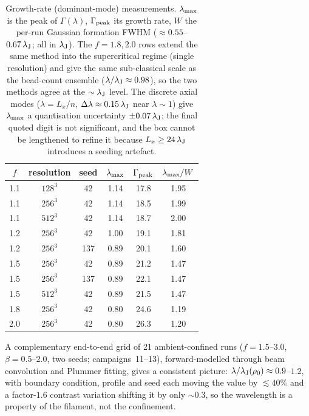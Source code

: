 \documentclass[usenatbib,twoside,twocolumn]{mnras}
\begin{document}
\begin{table}
\caption{Growth-rate (dominant-mode) measurements. $\lambda_{\rm max}$ is the peak of $\Gamma(\lambda)$, $\Gamma_{\rm peak}$ its growth rate, $W$ the per-run Gaussian formation FWHM ($\approx0.55$--$0.67\,\lambda_{\rm J}$; all in $\lambda_{\rm J}$). The $f=1.8,2.0$ rows extend the same method into the supercritical regime (single resolution) and give the same sub-classical scale as the bead-count ensemble ($\lambda/\lambda_{\rm J}\approx0.98$), so the two methods agree at the $\sim\lambda_{\rm J}$ level. The discrete axial modes ($\lambda=L_x/n$, $\Delta\lambda\approx0.15\,\lambda_{\rm J}$ near $\lambda\sim1$) give $\lambda_{\rm max}$ a quantisation uncertainty $\pm0.07\,\lambda_{\rm J}$; the final quoted digit is not significant, and the box cannot be lengthened to refine it because $L_x\geq24\,\lambda_{\rm J}$ introduces a seeding artefact.}
\label{tab:wave}
\footnotesize
\setlength{\tabcolsep}{4pt}
\begin{tabular}{cccccc}
\toprule
$f$ & resolution & seed & $\lambda_{\rm max}$ & $\Gamma_{\rm peak}$ & $\lambda_{\rm max}/W$ \\
\midrule
1.1 & $128^3$ & 42  & 1.14 & 17.8 & 1.95 \\
1.1 & $256^3$ & 42  & 1.14 & 18.5 & 1.99 \\
1.1 & $512^3$ & 42  & 1.14 & 18.7 & 2.00 \\
1.2 & $256^3$ & 42  & 1.00 & 19.1 & 1.81 \\
1.2 & $256^3$ & 137 & 0.89 & 20.1 & 1.60 \\
1.5 & $256^3$ & 42  & 0.89 & 21.2 & 1.47 \\
1.5 & $256^3$ & 137 & 0.89 & 22.1 & 1.47 \\
1.5 & $512^3$ & 42  & 0.89 & 21.5 & 1.47 \\
1.8 & $256^3$ & 42  & 0.80 & 24.6 & 1.19 \\
2.0 & $256^3$ & 42  & 0.80 & 26.3 & 1.20 \\
\bottomrule
\end{tabular}
\end{table}

A complementary end-to-end grid of 21 ambient-confined runs ($f=1.5$--$3.0$, $\beta=0.5$--$2.0$, two seeds; campaigns~11--13), forward-modelled through beam convolution and Plummer fitting, gives a consistent picture: $\lambda/\lambda_{\rm J}(\rho_0)\approx0.9$--$1.2$, with boundary condition, profile and seed each moving the value by $\lesssim40\%$ and a factor-$1.6$ contrast variation shifting it by only $\sim0.3$, so the wavelength is a property of the filament, not the confinement.
\end{document}
